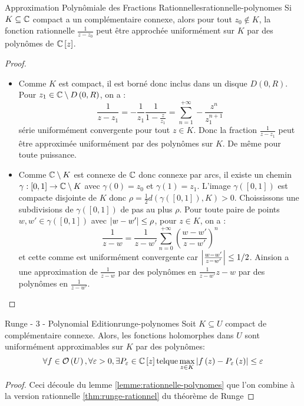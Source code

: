 \documentclass{cours}
\begin{document}
\begin{lemme}{Approximation Polynômiale des Fractions Rationnelles}{rationnelle-polynomes}
	Si $K \subseteq \mathbb{C}$ compact a un complémentaire connexe, alors pour tout $z_{0} \notin K$, la fonction rationnelle $\frac{1}{z - z_{0}}$ peut être approchée uniformément sur $K$ par des polynômes de $\mathbb{C}\left[z\right]$. 
\end{lemme}
\begin{proof}
	\begin{itemize}
		\item Comme $K$ est compact, il est borné donc inclus dans un disque $D\left(0, R\right)$. Pour $z_{1} \in \mathbb{C} \setminus D\left(0, R\right)$, on a : 
			\begin{equation*}
				\frac{1}{z - z_{1}} = - \frac{1}{z_{1}}\frac{1}{1 - \frac{z}{z_{1}}} = \sum_{n = 1}^{+ \infty}-\frac{z^{n}}{z_{1}^{n + 1}}
			\end{equation*}
			série uniformément convergente pour tout $z \in K$. Donc la fraction $\frac{1}{z - z_{1}}$ peut être approximée uniformément par des polynômes sur $K$. De même pour toute puissance. 
		\item Comme $\mathbb{C} \setminus K$ est connexe de $\mathbb{C}$ donc connexe par arcs, il existe un chemin $\gamma : \left[0, 1\right] \to \mathbb{C} \setminus K$ avec $\gamma\left(0\right) = z_{0}$ et $\gamma\left(1\right) = z_{1}$. L'image $\gamma\left(\left[0, 1\right]\right)$ est compacte disjointe de $K$ donc $\rho = \frac{1}{2}d\left(\gamma\left(\left[0, 1\right]\right), K\right) > 0$. Choississons une subdivisions de $\gamma\left(\left[0,1\right]\right)$ de pas au plus $\rho$. Pour toute paire de points $w, w' \in \gamma\left(\left[0, 1\right]\right)$ avec $\left|w - w'\right| \leq \rho$, pour $z \in K$, on a : 
			\begin{equation*}
				\frac{1}{z-w} = \frac{1}{z - w'}\sum_{n = 0}^{+\infty}\left(\frac{w - w'}{z - w'}\right)^{n}
			\end{equation*}
			et cette comme est uniformément convergente car $\left|\frac{w - w'}{z - w'}\right|\leq 1/2$. Ainsion a une approximation de $\frac{1}{z - w}$ par des polynômes en $\frac{1}{z - w'}{z - w}$ par des polynômes en $\frac{1}{z - w'}$.
	\end{itemize}
\end{proof}

\begin{théorème}{Runge - 3 - Polynomial Edition}{runge-polynomes}
	Soit $K \subseteq U$ compact de complémentaire connexe. Alors, les fonctions holomorphes dans $U$ sont uniformément approximables sur $K$ par des polynômes: 
	\begin{equation*}
		\forall f \in \mathcal{O}\left(U\right), \forall \varepsilon > 0, \exists P_{\varepsilon} \in \mathbb{C}\left[z\right] \mathrm{ tel que } \max_{z\in K} \left|f\left(z\right) - P_{\varepsilon}\left(z\right)\right|\leq \varepsilon
	\end{equation*}
\end{théorème}
\begin{proof}
	Ceci découle du lemme \ref{lemme:rationnelle-polynomes} que l'on combine à la version rationnelle \ref{thm:runge-rationnel} du théorème de Runge
\end{proof}
\end{document}
